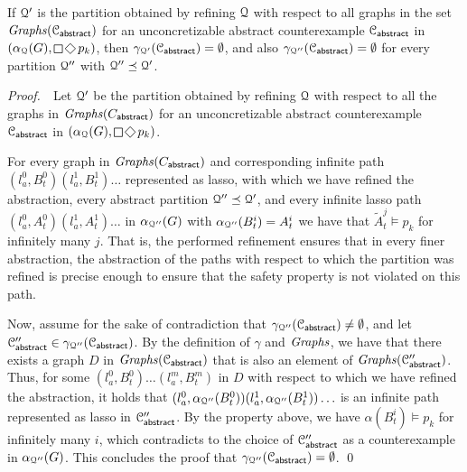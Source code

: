 \begin{thm}If $\mathcal{Q}'$ is the partition 
obtained by refining $\mathcal{Q}$ with respect to all graphs in the set $\mathit{Graphs}(\mathcal{C}_{\mathsf{abstract}})$ for an unconcretizable abstract counterexample $\mathcal{C}_{\mathsf{abstract}}$ in $(\alpha_\partition(G),\LTLglobally\LTLfinally p_k)$, then $\gamma_{\mathcal{Q}'}(\mathcal{C}_{\mathsf{abstract}}) = \emptyset$, and also $\gamma_{\mathcal{Q}''}(\mathcal{C}_{\mathsf{abstract}}) = \emptyset$ for every partition $\mathcal{Q}''$ with $\mathcal{Q}'' \preceq \mathcal{Q}'$.
\end{thm}
{\it Proof.}\ \ 
Let $\mathcal{Q}'$ be the partition obtained by refining $\mathcal{Q}$ with respect to all the graphs in $\mathit{Graphs}(C_{\mathsf{abstract}})$ for an unconcretizable abstract counterexample $\mathcal{C}_{\mathsf{abstract}}$ in $(\alpha_\partition(G),\LTLglobally\LTLfinally p_k)$.

For every graph in $\mathit{Graphs}(C_{\mathsf{abstract}})$ and corresponding infinite path $(l_a^0,B_t^0)(l_a^1,B_t^1)\ldots$ represented as lasso, with which we have refined the abstraction, every abstract partition $\mathcal{Q}'' \preceq \mathcal{Q}'$, and every infinite lasso path $(l_a^0,A_t^0) (l_a^1,A_t^1)\ldots$ in $\alpha_{\mathcal{Q}''}(G)$ with $\alpha_{\mathcal{Q}''}(B_t^i) = A_t^i$ we have that $\widetilde A_t^j \models p_k$ for infinitely many $j$. That is, the performed refinement ensures that in every finer abstraction, the abstraction of the paths with respect to which the partition was refined is precise enough to ensure that the safety property is not violated on this path.

Now, assume for the sake of contradiction that $\gamma_{\mathcal{Q}''}(\mathcal{C}_{\mathsf{abstract}}) \neq \emptyset$, and let $\mathcal{C}_{\mathsf{abstract}}'' \in\gamma_{\mathcal{Q}''}(\mathcal{C}_{\mathsf{abstract}})$. By the definition of $\gamma$ and $\mathit{Graphs}$, we have that there exists a graph $D$ in $\mathit{Graphs}(\mathcal{C}_{\mathsf{abstract}})$ that is also an element of $\mathit{Graphs}(\mathcal{C}_{\mathsf{abstract}}'')$. Thus, for some $(l_a^0,B_t^0)\ldots (l_a^m,B_t^m)$ in $D$ with respect to which we have refined the abstraction, it holds that $(l_a^0,\alpha_{\mathcal{Q}''}(B_t^0)) (l_a^1,\alpha_{\mathcal{Q}''}(B_t^1))\ldots$ is an infinite path represented as lasso in $\mathcal{C}_{\mathsf{abstract}}''$. By the property above, we have $\alpha(B_t^i)\models p_k$ for infinitely many $i$, which contradicts to the choice of $\mathcal{C}_{\mathsf{abstract}}''$ as a counterexample in $\alpha_{\mathcal{Q}''}(G)$. This concludes the proof that $\gamma_{\mathcal{Q}''}(\mathcal{C}_{\mathsf{abstract}}) = \emptyset$.
\qed
\bigskip 

